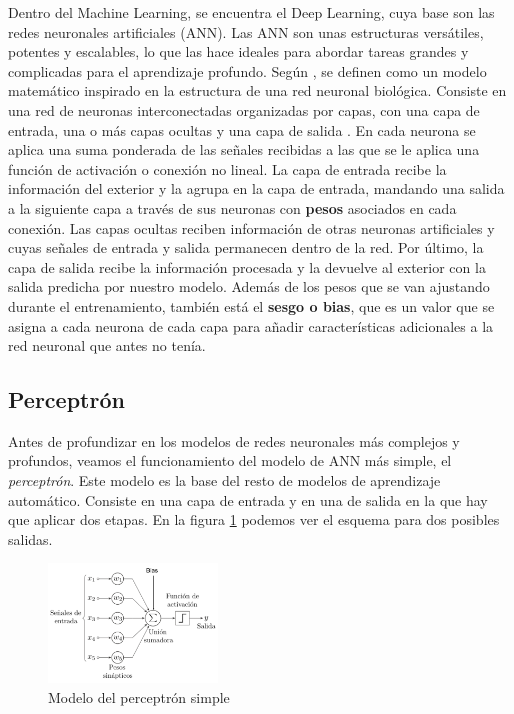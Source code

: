 Dentro del Machine Learning, se encuentra el Deep Learning, cuya base son las redes neuronales artificiales (ANN). Las ANN son unas estructuras versátiles, potentes y escalables, lo que las hace ideales para abordar tareas grandes y complicadas para el aprendizaje profundo. Según \citep{pajares2021aprendizaje}, se definen como un modelo matemático inspirado en la estructura de una red neuronal biológica. Consiste en una red de neuronas interconectadas organizadas por capas, con una capa de entrada, una o más capas ocultas y una capa de salida \citep{dolling2002artificial}. En cada neurona se aplica una suma ponderada de las señales recibidas a las que se le aplica una función de activación o conexión no lineal. La capa de entrada recibe la información del exterior y la agrupa en la capa de entrada, mandando una salida a la siguiente capa a través de sus neuronas con \textbf{pesos} asociados en cada conexión. Las capas ocultas reciben información de otras neuronas artificiales y cuyas señales de entrada y salida permanecen dentro de la red. Por último, la capa de salida recibe la información procesada y la devuelve al exterior con la salida predicha por nuestro modelo. Además de los pesos que se van ajustando durante el entrenamiento, también está el \textbf{sesgo o bias}, que es un valor que se asigna a cada neurona de cada capa para añadir características adicionales a la red neuronal que antes no tenía. 


\subsection{Perceptrón}

Antes de profundizar en los modelos de redes neuronales más complejos y profundos, veamos el funcionamiento del modelo de ANN más simple, el \textit{perceptrón}. Este modelo es la base del resto de modelos de aprendizaje automático. Consiste en una capa de entrada y en una de salida en la que hay que aplicar dos etapas. En la figura \ref{img: perceptron} podemos ver el esquema para dos posibles salidas.

\begin{figure}[h!]
    \centering
    \includegraphics[width=0.4\textwidth]{img/perceptron.png}
    \caption{Modelo del perceptrón simple}
    \label{img: perceptron}
\end{figure}


